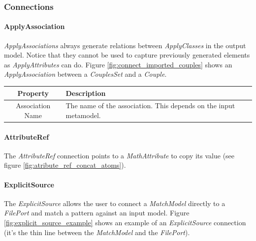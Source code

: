 


\subsubsection{Connections}

\paragraph{ApplyAssociation}

\emph{ApplyAssociations} always generate relations between \emph{ApplyClasses}
in the output model. Notice that they cannot be used to capture previously
generated elements as \emph{ApplyAttributes} can do. Figure
\ref{fig:connect_imported_couples} shows an \emph{ApplyAssociation} between a
\emph{CouplesSet} and a \emph{Couple}.


\begin{center}
  \begin{tabular}{ | c | p{\paragraphsize} | }
    \hline
    \textbf{Property} & \textbf{Description} \\ \hline
    Association Name & The name of the association. This depends on the input
  metamodel.  \\
    \hline
  \end{tabular}
\end{center}


\paragraph{AttributeRef}

The \emph{AttributeRef} connection points to a \emph{MathAttribute} to copy its
value (see figure \ref{fig:atribute_ref_concat_atoms}).



\paragraph{ExplicitSource}

The \emph{ExplicitSource} allows the user to connect a \emph{MatchModel}
directly to a \emph{FilePort} and match a pattern against an input model.
Figure \ref{fig:explicit_source_example} shows an example of an
\emph{ExplicitSource} connection (it's the thin line between the
\emph{MatchModel} and the \emph{FilePort}).

